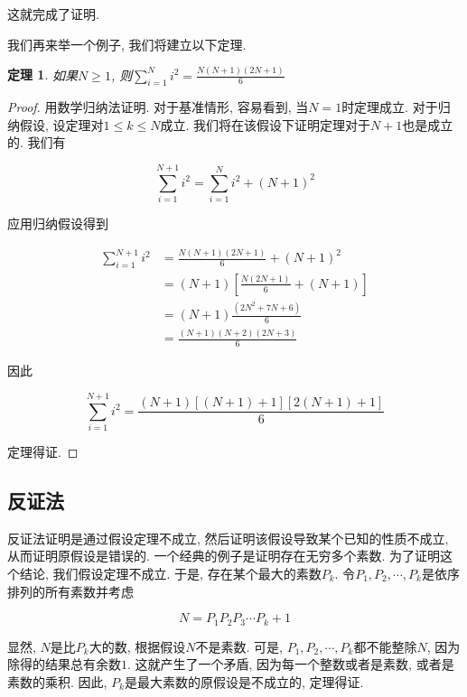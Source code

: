 \documentclass[oneside,10pt,fontset=none]{ctexbook}
\numberwithin{definition}{chapter}
\newtheorem{theorem}{定理}
\numberwithin{theorem}{chapter}
\newtheorem{proof}{证明}
\numberwithin{proof}{chapter}
\begin{document}
这就完成了证明.

我们再来举一个例子, 我们将建立以下定理.

\begin{theorem}
    如果$N\geq 1$, 则$\sum_{i=1}^{N}i^2=\frac{N(N+1)(2N+1)}{6}$
\end{theorem}

\begin{proof}
    用数学归纳法证明. 对于基准情形, 容易看到, 当$N=1$时定理成立. 对于归纳假设, 设定理对$1\leq k\leq N$成立. 我们将在该假设下证明定理对于$N+1$也是成立的. 我们有

    \begin{equation*}
        \sum_{i=1}^{N+1}i^2=\sum_{i=1}^{N}i^2+(N+1)^2
    \end{equation*}

    应用归纳假设得到

    \begin{equation*}
        \begin{split}
            \sum_{i=1}^{N+1}i^2 &= \frac{N(N+1)(2N+1)}{6} + (N+1)^2 \\
                                &= (N+1)[\frac{N(2N+1)}{6} + (N+1)] \\
                                &= (N+1)\frac{(2N^2+7N+6)}{6} \\
                                &= \frac{(N+1)(N+2)(2N+3)}{6}
        \end{split}
    \end{equation*}

    因此

    \begin{equation*}
        \sum_{i=1}^{N+1}i^2 = \frac{(N+1)[(N+1)+1][2(N+1)+1]}{6}
    \end{equation*}

    定理得证.
\end{proof}

\subsection{反证法}

反证法证明是通过假设定理不成立, 然后证明该假设导致某个已知的性质不成立, 从而证明原假设是错误的. 一个经典的例子是证明存在无穷多个素数. 为了证明这个结论, 我们假设定理不成立. 于是, 存在某个最大的素数$P_k$. 令$P_1,P_2,\cdots,P_k$是依序排列的所有素数并考虑

$$
N=P_1P_2P_3\cdots P_k+1
$$

显然, $N$是比$P_k$大的数, 根据假设$N$不是素数. 可是, $P_1,P_2,\cdots,P_k$都不能整除$N$, 因为除得的结果总有余数$1$. 这就产生了一个矛盾, 因为每一个整数或者是素数, 或者是素数的乘积. 因此, $P_k$是最大素数的原假设是不成立的, 定理得证.
\end{document}
